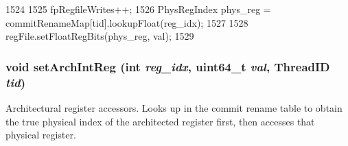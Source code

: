 \begin{DoxyCode}
1524 {
1525     fpRegfileWrites++;
1526     PhysRegIndex phys_reg = commitRenameMap[tid].lookupFloat(reg_idx);
1527 
1528     regFile.setFloatRegBits(phys_reg, val);
1529 }
\end{DoxyCode}
\hypertarget{classFullO3CPU_a09df95cc1f92c9002cd7c0506e2ba864}{
\subsubsection[{setArchIntReg}]{\setlength{\rightskip}{0pt plus 5cm}void setArchIntReg (int {\em reg\_\-idx}, \/  uint64\_\-t {\em val}, \/  {\bf ThreadID} {\em tid})}}
\label{classFullO3CPU_a09df95cc1f92c9002cd7c0506e2ba864}
Architectural register accessors. Looks up in the commit rename table to obtain the true physical index of the architected register first, then accesses that physical register. 


